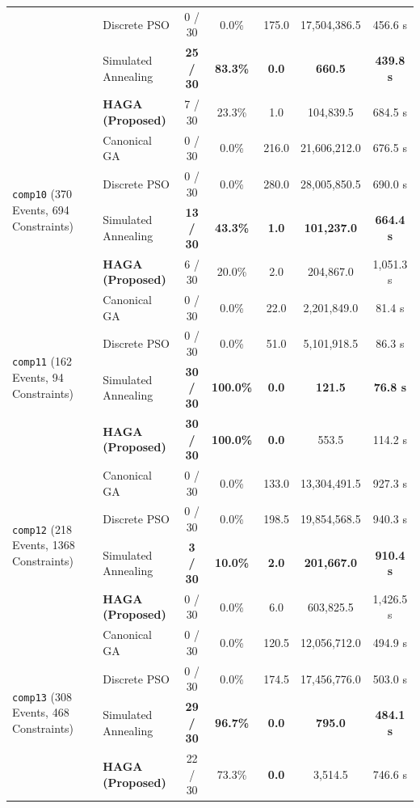 \documentclass[journal]{IEEEtran}
\begin{document}
\begin{table}[!t]
{\begin{tabular}{ll c c c c c}
& Discrete PSO        & 0 / 30 & 0.0\%  & 175.0 & 17,504,386.5 & 456.6 s \\
& Simulated Annealing & \textbf{25 / 30} & \textbf{83.3\%} & \textbf{0.0} & \textbf{660.5} & \textbf{439.8 s} \\
& \textbf{HAGA (Proposed)} & 7 / 30 & 23.3\% & 1.0 & 104,839.5 & 684.5 s \\
\midrule
\multirow{4}{*}{\texttt{comp10} (370 Events, 694 Constraints)} 
& Canonical GA        & 0 / 30 & 0.0\% & 216.0 & 21,606,212.0 & 676.5 s \\
& Discrete PSO        & 0 / 30 & 0.0\% & 280.0 & 28,005,850.5 & 690.0 s \\
& Simulated Annealing & \textbf{13 / 30} & \textbf{43.3\%} & \textbf{1.0} & \textbf{101,237.0} & \textbf{664.4 s} \\
& \textbf{HAGA (Proposed)} & 6 / 30 & 20.0\% & 2.0 & 204,867.0 & 1,051.3 s \\
\midrule
\multirow{4}{*}{\texttt{comp11} (162 Events, 94 Constraints)} 
& Canonical GA        & 0 / 30 & 0.0\%  & 22.0 & 2,201,849.0 & 81.4 s \\
& Discrete PSO        & 0 / 30 & 0.0\%  & 51.0 & 5,101,918.5 & 86.3 s \\
& Simulated Annealing & \textbf{30 / 30} & \textbf{100.0\%} & \textbf{0.0} & \textbf{121.5} & \textbf{76.8 s} \\
& \textbf{HAGA (Proposed)} & \textbf{30 / 30} & \textbf{100.0\%} & \textbf{0.0} & 553.5 & 114.2 s \\
\midrule
\multirow{4}{*}{\texttt{comp12} (218 Events, 1368 Constraints)} 
& Canonical GA        & 0 / 30 & 0.0\% & 133.0 & 13,304,491.5 & 927.3 s \\
& Discrete PSO        & 0 / 30 & 0.0\% & 198.5 & 19,854,568.5 & 940.3 s \\
& Simulated Annealing & \textbf{3 / 30} & \textbf{10.0\%} & \textbf{2.0} & \textbf{201,667.0} & \textbf{910.4 s} \\
& \textbf{HAGA (Proposed)} & 0 / 30 & 0.0\% & 6.0 & 603,825.5 & 1,426.5 s \\
\midrule
\multirow{4}{*}{\texttt{comp13} (308 Events, 468 Constraints)} 
& Canonical GA        & 0 / 30 & 0.0\%  & 120.5 & 12,056,712.0 & 494.9 s \\
& Discrete PSO        & 0 / 30 & 0.0\%  & 174.5 & 17,456,776.0 & 503.0 s \\
& Simulated Annealing & \textbf{29 / 30} & \textbf{96.7\%} & \textbf{0.0} & \textbf{795.0} & \textbf{484.1 s} \\
& \textbf{HAGA (Proposed)} & 22 / 30 & 73.3\% & \textbf{0.0} & 3,514.5 & 746.6 s \\

\end{tabular}}
\end{table}
\end{document}
